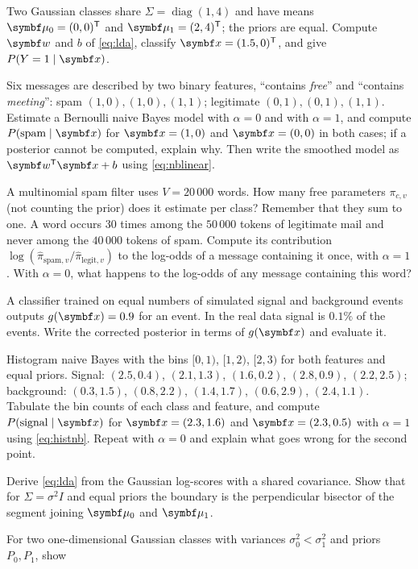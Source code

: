 \documentclass[11pt]{article}
\newcommand{\w}{\vect{w}}
\begin{document}
\begin{questions}
\begin{calculations}
\item Two Gaussian classes share $\Sigma = \operatorname{diag}(1, 4)$ and have means $\vmu_0 = (0, 0)\T$ and
$\vmu_1 = (2, 4)\T$; the priors are equal. Compute $\w$ and $b$ of \eqref{eq:lda}, classify $\x = (1.5, 0)\T$, and give
$P(Y = 1 \mid \x)$.
\item Six messages are described by two binary features, ``contains \emph{free}'' and ``contains \emph{meeting}'':
spam $(1,0), (1,0), (1,1)$; legitimate $(0,1), (0,1), (1,1)$. Estimate a Bernoulli naive Bayes model with
$\alpha = 0$ and with $\alpha = 1$, and compute $P(\text{spam} \mid \x)$ for $\x = (1, 0)$ and $\x = (0, 0)$ in both
cases; if a posterior cannot be computed, explain why. Then write the smoothed model as $\w\T\x + b$ using
\eqref{eq:nblinear}.
\item A multinomial spam filter uses $V = 20\,000$ words. How many free parameters $\pi_{c,v}$ (not counting the prior) does it estimate per class? Remember that they sum to
one. A word occurs 30 times among the $50\,000$ tokens of legitimate mail and never among the $40\,000$ tokens of spam.
Compute its contribution $\log(\hat\pi_{\mathrm{spam},v}/\hat\pi_{\mathrm{legit},v})$ to the log-odds of a message
containing it once, with $\alpha = 1$. With $\alpha = 0$, what happens to the log-odds of any message containing this
word?
\item A classifier trained on equal numbers of simulated signal and background events outputs $g(\x) = 0.9$ for an
event. In the real data signal is $0.1\%$ of the events. Write the corrected posterior in terms of $g(\x)$ and evaluate it.
\item Histogram naive Bayes with the bins $[0, 1)$, $[1, 2)$, $[2, 3)$ for both features and equal priors. Signal:
$(2.5, 0.4)$, $(2.1, 1.3)$, $(1.6, 0.2)$, $(2.8, 0.9)$, $(2.2, 2.5)$; background: $(0.3, 1.5)$, $(0.8, 2.2)$,
$(1.4, 1.7)$, $(0.6, 2.9)$, $(2.4, 1.1)$. Tabulate the bin counts of each class and feature, and compute
$P(\text{signal} \mid \x)$ for $\x = (2.3, 1.6)$ and $\x = (2.3, 0.5)$ with $\alpha = 1$ using \eqref{eq:histnb}. Repeat
with $\alpha = 0$ and explain what goes wrong for the second point.
\end{calculations}
\begin{derivations}
\item Derive \eqref{eq:lda} from the Gaussian log-scores with a shared covariance. Show that for $\Sigma = \sigma^2 I$
and equal priors the boundary is the perpendicular bisector of the segment joining $\vmu_0$ and $\vmu_1$.
\item For two one-dimensional Gaussian classes with variances $\sigma_0^2 < \sigma_1^2$ and priors $P_0, P_1$, show

\end{derivations}
\end{questions}
\end{document}
